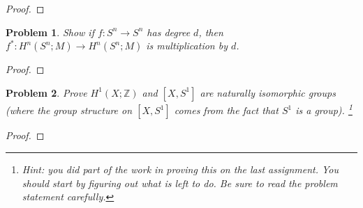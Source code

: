 \documentclass[11pt]{article}
\newtheorem{problem}{Problem}
\begin{document}
\begin{proof}

\end{proof} 


\pagebreak 



\begin{problem}
Show if $f:S^n\to S^n$ has degree $d$, then $f^*:H^n(S^n;M)\to H^n(S^n;M)$ is multiplication by $d$. 
\end{problem}

\begin{proof}

\end{proof} 


\pagebreak 



\begin{problem}
Prove $H^1(X;\mathbb Z)$ and $[X,S^1]$ are naturally isomorphic groups (where the group structure on $[X,S^1]$ comes from the fact that $S^1$ is a group). \footnote{Hint: you did part of the work in proving this on the last assignment. You should start by figuring out what is left to do. Be sure to read the problem statement carefully.} 
\end{problem}

\begin{proof}

\end{proof}
\end{document}
